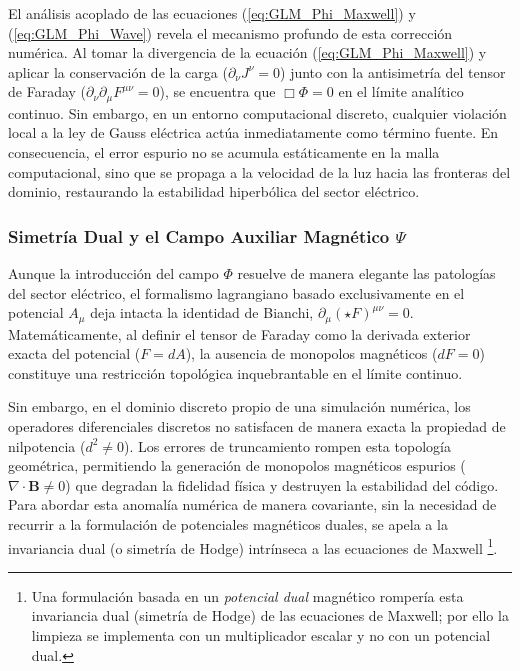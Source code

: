 El análisis acoplado de las ecuaciones (\ref{eq:GLM_Phi_Maxwell}) y (\ref{eq:GLM_Phi_Wave}) revela el mecanismo profundo de esta corrección numérica. Al tomar la divergencia de la ecuación (\ref{eq:GLM_Phi_Maxwell}) y aplicar la conservación de la carga ($\partial_\nu J^\nu = 0$) junto con la antisimetría del tensor de Faraday ($\partial_\nu \partial_\mu F^{\mu\nu} = 0$), se encuentra que $\Box \Phi = 0$ en el límite analítico continuo. Sin embargo, en un entorno computacional discreto, cualquier violación local a la ley de Gauss eléctrica actúa inmediatamente como término fuente. En consecuencia, el error espurio no se acumula estáticamente en la malla computacional, sino que se propaga a la velocidad de la luz hacia las fronteras del dominio, restaurando la estabilidad hiperbólica del sector eléctrico.

\subsubsection{Simetría Dual y el Campo Auxiliar Magnético $\Psi$}

\primerparrafo Aunque la introducción del campo $\Phi$ resuelve de manera elegante las patologías del sector eléctrico, el formalismo lagrangiano basado exclusivamente en el potencial $A_\mu$ deja intacta la identidad de Bianchi, $\partial_\mu (\star F)^{\mu\nu} = 0$. Matemáticamente, al definir el tensor de Faraday como la derivada exterior exacta del potencial ($F=dA$), la ausencia de monopolos magnéticos ($dF=0$) constituye una restricción topológica inquebrantable en el límite continuo. 

Sin embargo, en el dominio discreto propio de una simulación numérica, los operadores diferenciales discretos no satisfacen de manera exacta la propiedad de nilpotencia ($d^2 \neq 0$). Los errores de truncamiento rompen esta topología geométrica, permitiendo la generación de monopolos magnéticos espurios ($\nabla \cdot \mathbf{B} \neq 0$) que degradan la fidelidad física y destruyen la estabilidad del código. Para abordar esta anomalía numérica de manera covariante, sin la necesidad de recurrir a la formulación de potenciales magnéticos duales, se apela a la invariancia dual (o simetría de Hodge) intrínseca a las ecuaciones de Maxwell \parencite{lee2004}\footnote{Una formulación basada en un \emph{potencial dual} magnético rompería esta invariancia dual (simetría de Hodge) de las ecuaciones de Maxwell; por ello la limpieza se implementa con un multiplicador escalar y no con un potencial dual.}. 

